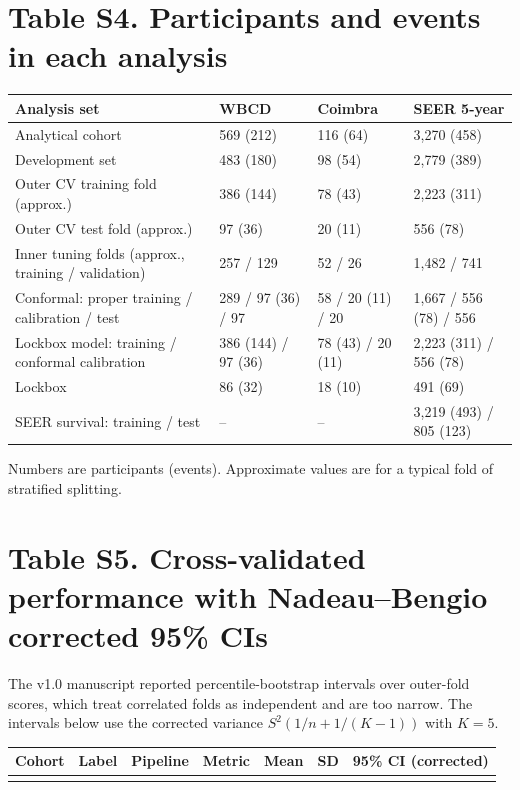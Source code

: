 \documentclass[10pt,a4paper]{article}
\begin{document}
\section*{Table S4. Participants and events in each analysis}
{\small
\begin{tabularx}{\textwidth}{@{}Ylll@{}}
\toprule
\textbf{Analysis set} & \textbf{WBCD} & \textbf{Coimbra} & \textbf{SEER 5-year}\\
\midrule
Analytical cohort & 569 (212) & 116 (64) & 3,270 (458)\\
Development set & 483 (180) & 98 (54) & 2,779 (389)\\
Outer CV training fold (approx.) & 386 (144) & 78 (43) & 2,223 (311)\\
Outer CV test fold (approx.) & 97 (36) & 20 (11) & 556 (78)\\
Inner tuning folds (approx., training / validation) & 257 / 129 & 52 / 26 & 1,482 / 741\\
Conformal: proper training / calibration / test & 289 / 97 (36) / 97 & 58 / 20 (11) / 20 & 1,667 / 556 (78) / 556\\
Lockbox model: training / conformal calibration & 386 (144) / 97 (36) & 78 (43) / 20 (11) & 2,223 (311) / 556 (78)\\
Lockbox & 86 (32) & 18 (10) & 491 (69)\\
SEER survival: training / test & -- & -- & 3,219 (493) / 805 (123)\\
\bottomrule
\end{tabularx}
}
Numbers are participants (events). Approximate values are for a typical fold of stratified splitting.

\newpage
\section*{Table S5. Cross-validated performance with Nadeau--Bengio corrected 95\% CIs}
The v1.0 manuscript reported percentile-bootstrap intervals over outer-fold scores, which treat correlated folds as independent and are too narrow. The intervals below use the corrected variance $S^2(1/n+1/(K-1))$ with $K=5$.
{\small
\begin{longtable}{@{}lllllll@{}}
\toprule
\textbf{Cohort} & \textbf{Label} & \textbf{Pipeline} & \textbf{Metric} & \textbf{Mean} & \textbf{SD} & \textbf{95\% CI (corrected)}\\
\midrule\endhead
\bottomrule\endfoot
{}{s5_rows.tex}
\end{longtable}
}
\end{document}
